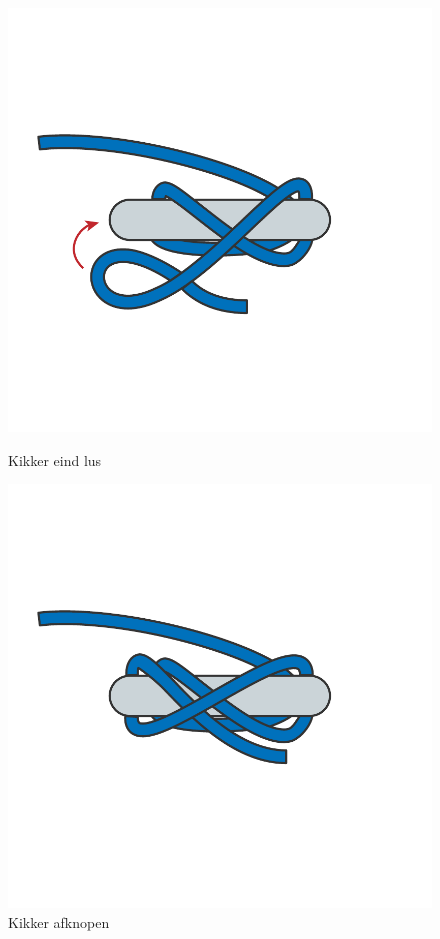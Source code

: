 \begin{figure}[h]
\begin{minipage}[b]{0.32\textwidth}
    \includegraphics[width=\textwidth]{Hoofdstukken/Schiemannen/pdf/kikker2.pdf}
    \caption{Kikker eind lus}
    \label{pic:kikker2}
    \end{minipage}
  \hfill
   \begin{minipage}[b]{0.32\textwidth}
    \centering
    \includegraphics[width=\textwidth]{Hoofdstukken/Schiemannen/pdf/kikker3.pdf}
    \caption{Kikker afknopen}
    \label{pic:kikker3}
    \end{minipage}
\end{figure}
